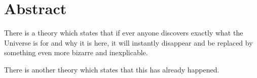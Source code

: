 \thispagestyle{empty}
\section*{Abstract}
\begin{doublespace}
There is a theory which states that if ever anyone discovers exactly what the Universe is for and why it is here, it will instantly disappear and be replaced by something even more bizarre and inexplicable.

There is another theory which states that this has already happened.
\end{doublespace}   

